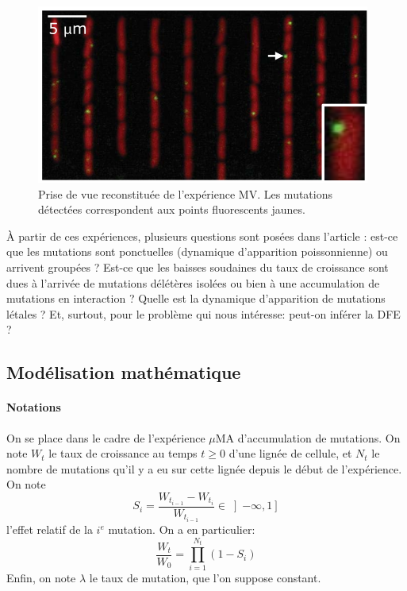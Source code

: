 \documentclass[12pt]{article}
\newcommand{\iof}[1]{\left]#1\right]}
\begin{document}
\begin{figure}[h]
  \begin{center}
    \vspace{3mm}
    \includegraphics[scale=0.5]{../Img/Schema_MV.png}
  \end{center}
  \caption{\label{fig:MV}Prise de vue reconstituée de l'expérience MV. Les mutations détectées correspondent aux points fluorescents jaunes.}
\end{figure}

À partir de ces expériences, plusieurs questions sont posées dans l'article : est-ce que les mutations sont ponctuelles (dynamique d'apparition poissonnienne) ou arrivent groupées ? Est-ce que les baisses soudaines du taux de croissance sont dues à l’arrivée de mutations délétères isolées ou bien à une accumulation de mutations en interaction ? Quelle est la dynamique d’apparition de mutations létales ? Et, surtout, pour le problème qui nous intéresse: peut-on inférer la DFE ?

\subsection{Modélisation mathématique}

\paragraph{Notations}
On se place dans le cadre de l'expérience $\mu$MA d'accumulation de mutations. On note $W_t$ le taux de croissance au temps $t\geqslant 0$ d'une lignée de cellule, et $N_t$ le nombre de mutations qu'il y a eu sur cette lignée depuis le début de l'expérience. On note \[S_i=\frac{W_{t_{i-1}}-W_{t_i}}{W_{t_{i-1}}}\in\iof{-\infty,1}\] l'effet relatif de la $i^e$ mutation. On a en particulier: 
\begin{equation}\label{mod}
  \frac{W_t}{W_0}=\prod_{i=1}^{N_t}(1-S_i)
\end{equation}
Enfin, on note $\lambda$ le taux de mutation, que l'on suppose constant.
\end{document}
